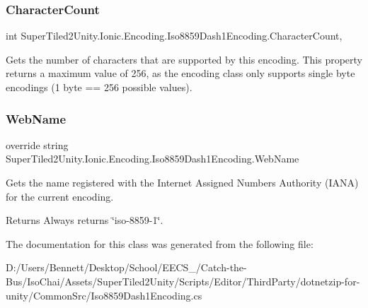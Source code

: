\subsubsection{\texorpdfstring{Character\+Count}{CharacterCount}}
{\footnotesize\ttfamily int Super\+Tiled2\+Unity.\+Ionic.\+Encoding.\+Iso8859\+Dash1\+Encoding.\+Character\+Count\hspace{0.3cm}{\ttfamily [static]}, {\ttfamily [get]}}



Gets the number of characters that are supported by this encoding. This property returns a maximum value of 256, as the encoding class only supports single byte encodings (1 byte == 256 possible values). 

\mbox{\label{class_super_tiled2_unity_1_1_ionic_1_1_encoding_1_1_iso8859_dash1_encoding_a318d765b9a1206a73efdd8faf64d52b5}} 
\subsubsection{\texorpdfstring{Web\+Name}{WebName}}
{\footnotesize\ttfamily override string Super\+Tiled2\+Unity.\+Ionic.\+Encoding.\+Iso8859\+Dash1\+Encoding.\+Web\+Name\hspace{0.3cm}{\ttfamily [get]}}



Gets the name registered with the Internet Assigned Numbers Authority (I\+A\+NA) for the current encoding. 

\begin{DoxyReturn}{Returns}
Always returns \char`\"{}iso-\/8859-\/1\char`\"{}. 
\end{DoxyReturn}


The documentation for this class was generated from the following file\+:\begin{DoxyCompactItemize}
\item 
D\+:/\+Users/\+Bennett/\+Desktop/\+School/\+E\+E\+C\+S\+\_/\+Catch-\/the-\/\+Bus/\+Iso\+Chai/\+Assets/\+Super\+Tiled2\+Unity/\+Scripts/\+Editor/\+Third\+Party/dotnetzip-\/for-\/unity/\+Common\+Src/Iso8859\+Dash1\+Encoding.\+cs\end{DoxyCompactItemize}
